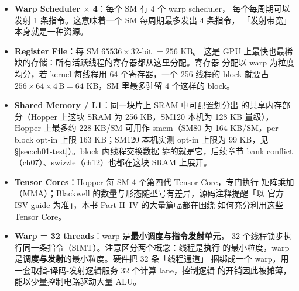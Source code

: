 \begin{itemize}
\item \textbf{Warp Scheduler $\times$ 4}：每个 SM 有 4 个 warp scheduler，
  每个每周期可以发射 1 条指令。这意味着一个 SM 每周期最多发出 4 条指令，
  「发射带宽」本身就是一种资源。
\item \textbf{Register File}：每 SM $65536 \times 32$-bit $= 256$ KB。
  这是 GPU 上最快也最稀缺的存储：所有活跃线程的寄存器都从这里分配。寄存器
  分配以 warp 为粒度均分，若 kernel 每线程用 64 个寄存器，一个 256 线程的
  block 就要占 $256 \times 64 \times 4\,\mathrm{B} = 64$ KB，SM 里最多驻留
  4 个这样的 block。
\item \textbf{Shared Memory / L1}：同一块片上 SRAM 中可配置划分出
  的共享内存部分（Hopper 上这块 SRAM 为 256 KB，SM120 本机为 128 KB 量级），
  Hopper 上最多约 228 KB/SM 可用作 smem（SM80 为 164 KB/SM，per-block
  opt-in 上限 163 KB；SM120 本机实测
  opt-in 上限为 99 KB，见 \S\ref{sec:ch01-test}）。block 内线程交换数据
  靠的就是它，后续章节 bank conflict（ch07）、swizzle（ch12）也都在这块
  SRAM 上展开。
\item \textbf{Tensor Cores}：Hopper 每 SM 4 个第四代 Tensor Core，专门执行
  矩阵乘加（MMA）；Blackwell 的数量与形态随型号有差异，源码注释提醒「以
  官方 ISV guide 为准」，本书 Part II--IV 的大量篇幅都在围绕
  如何充分利用这些 Tensor Core。
\item \textbf{Warp = 32 threads}：warp 是\textbf{最小调度与指令发射单元}，
  32 个线程锁步执行同一条指令（SIMT）。注意区分两个概念：线程是\textbf{执行}
  的最小粒度，warp 是\textbf{调度与发射}的最小粒度。硬件把 32 条「线程通道」
  捆绑成一个 warp，用一套取指-译码-发射逻辑服务 32 个计算 lane，控制逻辑
  的开销因此被摊薄，能以少量控制电路驱动大量 ALU。
\end{itemize}


